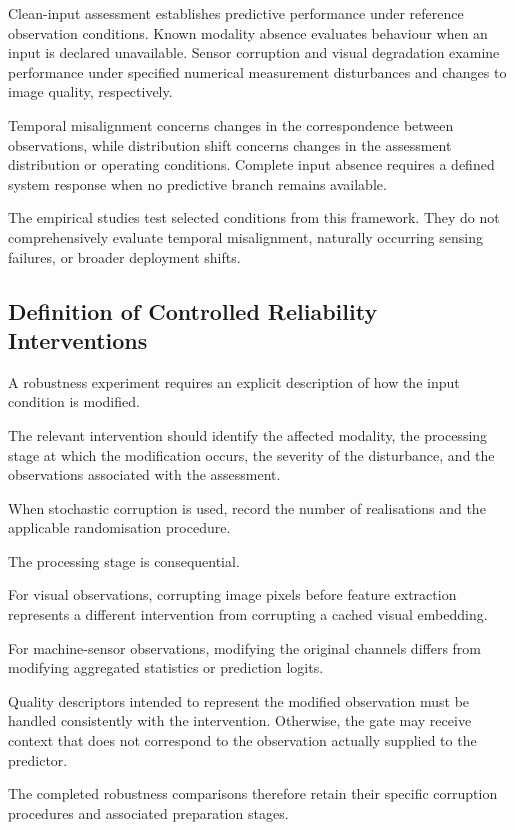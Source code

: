 Clean-input assessment establishes predictive performance under reference observation conditions. Known modality absence evaluates behaviour when an input is declared unavailable. Sensor corruption and visual degradation examine performance under specified numerical measurement disturbances and changes to image quality, respectively.

Temporal misalignment concerns changes in the correspondence between observations, while distribution shift concerns changes in the assessment distribution or operating conditions. Complete input absence requires a defined system response when no predictive branch remains available.

The empirical studies test selected conditions from this framework. They do not comprehensively evaluate temporal misalignment, naturally occurring sensing failures, or broader deployment shifts.

\subsection{Definition of Controlled Reliability Interventions}

A robustness experiment requires an explicit description of how the input condition is modified.

The relevant intervention should identify the affected modality, the processing stage at which the modification occurs, the severity of the disturbance, and the observations associated with the assessment.

When stochastic corruption is used, record the number of realisations and the applicable randomisation procedure.

The processing stage is consequential.

For visual observations, corrupting image pixels before feature extraction represents a different intervention from corrupting a cached visual embedding.

For machine-sensor observations, modifying the original channels differs from modifying aggregated statistics or prediction logits.

Quality descriptors intended to represent the modified observation must be handled consistently with the intervention. Otherwise, the gate may receive context that does not correspond to the observation actually supplied to the predictor.

The completed robustness comparisons therefore retain their specific corruption procedures and associated preparation stages.

